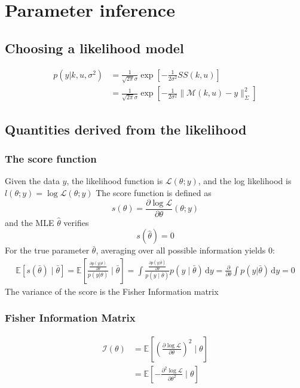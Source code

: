\documentclass[a4paper,11pt]{article}
\newcommand{\Ex}{\mathbb{E}}
\theoremstyle{defi}
\numberwithin{thmCounter}{section}
\begin{document}
\section{Parameter inference}
\subsection{Choosing a likelihood model}
\begin{align*}
  p(y | k, u, \sigma^2) &= \frac{1}{\sqrt{2\pi}\sigma}\exp\left[-\frac{1}{2\sigma^2}SS(k,u)\right] \\
                         &= \frac{1}{\sqrt{2\pi}\sigma}\exp\left[-\frac{1}{2\sigma^2} \|\mathcal{M}(k,u) - y \|^2_{\Sigma}\right]
\end{align*}
\subsection{Quantities derived from the likelihood}
\subsubsection{The score function}
\label{sec:score_function}
Given the data $y$, the likelihood function is $\mathcal{L}(\theta ; y)$, and the log likelihood is $l(\theta;y) = \log \mathcal{L}(\theta;y)$
The score function is defined as
\begin{equation}
  \label{eq:def_score_function}
  s(\theta) = \frac{\partial \log \mathcal{L}}{\partial \theta}(\theta; y)
\end{equation}
and the MLE $\hat{\theta}$ verifies
\begin{equation}
  \label{eq:MLE}
  s(\hat{\theta}) = 0
\end{equation}
For the true parameter $\bar{\theta}$, averaging over all possible information yields $0$:
\begin{align}
  \Ex\left[s(\bar{\theta}) \mid \bar{\theta}\right] = \Ex\left[\frac{\frac{\partial p(y|\theta)}{\partial \theta}}{p(y|\theta)} \mid \bar{\theta}\right] = \int \frac{\frac{\partial p(y|\bar\theta)}{\partial \theta}}{p(y\mid\bar\theta)} p (y \mid \bar\theta) \,\mathrm{d}y = \frac{\partial}{\partial \theta} \int p(y|\bar\theta) \,\mathrm{d}y = 0
\end{align}
The variance of the score is the Fisher Information matrix

\subsubsection{Fisher Information Matrix}
\label{sec:fisher_information_matrix}
\begin{align}
  \label{eq:def_fisher_information_matrix}
  \mathcal{I}(\theta) &= \Ex\left[\left(\frac{\partial \log \mathcal{L}}{\partial \theta}\right)^2 \mid \theta\right] \\
                        &=\Ex\left[-\frac{\partial^2 \log \mathcal{L}}{\partial \theta^2} \mid \theta\right]
\end{align}
\end{document}
